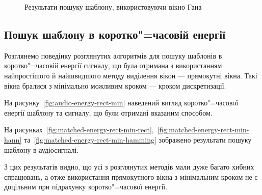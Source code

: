 \begin{figure}[h]
            \caption{Результати пошуку шаблону, використовуючи вікно Гана}
            \label{fig:audio-plain-hanning}
        \end{figure}
        \clearpage
    \subsection{Пошук шаблону в коротко"=часовій енергії}
        Розглянемо поведінку розглянутих алгоритмів для пошуку шаблонів в коротко"=часовій енергії сигналу, що
        була отримана з використанням найпростішого й найшвидшого методу виділення вікон --- прямокутні вікна.
        Такі вікна бралися з мінімально можливим кроком --- кроком дискретизації.

        На рисунку~\ref{fig:audio-energy-rect-min} наведений вигляд коротко"=часової енергії шаблону та сигналу, що
        були отримані вказаним способом.

        На рисунках~\ref{fig:matched-energy-rect-min-rect},~\ref{fig:matched-energy-rect-min-hann}
        та~\ref{fig:matched-energy-rect-min-hamming} зображено результати пошуку шаблону в аудіосигналі.

        З цих результатів видно, що усі з розглянутих методів мали дуже багато хибних спрацювань,
        а отже використання прямокутного вікна з мінімальним кроком не є доцільним при підрахунку коротко"=часової
        енергії.

